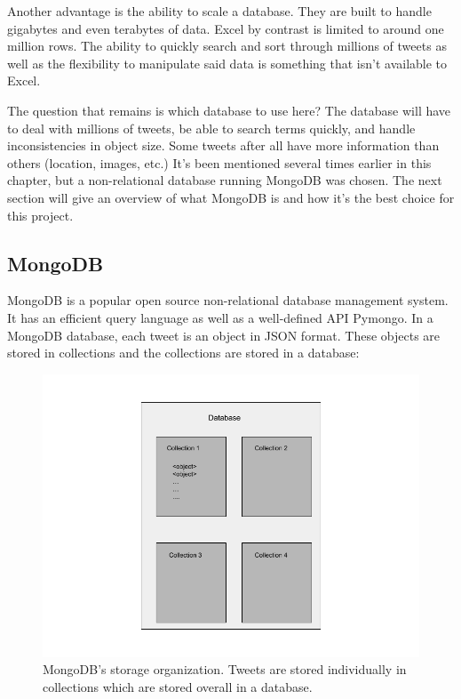 \documentclass[11pt, twoside, reqno]{book}
\begin{document}
Another advantage is the ability to scale a database. They are built to handle gigabytes and even terabytes of data. Excel by contrast is limited to around one million rows\cite{connolly_begg_2014}. The ability to quickly search and sort through millions of tweets as well as the flexibility to manipulate said data is something that isn't available to Excel.

The question that remains is which database to use here? The database will have to deal with millions of tweets, be able to search terms quickly, and handle inconsistencies in object size. Some tweets after all have more information than others (location, images, etc.) It's been mentioned several times earlier in this chapter, but a non-relational database running MongoDB was chosen. The next section will give an overview of what MongoDB is and how it's the best choice for this project. 

\subsection{MongoDB}
\hspace{0.2in} MongoDB is a popular open source non-relational database management system. It has an efficient query language as well as a well-defined API Pymongo. In a MongoDB database, each tweet is an object in JSON format. These objects are stored in collections and the collections are stored in a database\cite{mongo_docs}:

\begin{figure}[H]
	\centering
	\includegraphics[scale=0.5]{database}
	\caption{MongoDB's storage organization. Tweets are stored individually in collections which are stored overall in a database.}
	\label{fig:dbstructure}
\end{figure}
\end{document}
